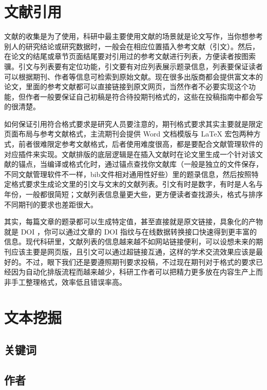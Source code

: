 \documentclass[]{tufte-book}
\begin{document}
\hypertarget{ux6587ux732eux5f15ux7528}{%
\section{文献引用}\label{ux6587ux732eux5f15ux7528}}

文献的收集是为了使用，科研中最主要使用文献的场景就是论文写作，当你想参考别人的研究结论或研究数据时，一般会在相应位置插入参考文献（引文）。然后，在论文的结尾或章节页面结尾要对引用过的参考文献进行列表，方便读者按图索骥。引文与列表要有定位功能，引文要有对应列表展示题录信息，列表要保证读者可以根据期刊、作者等信息可检索到原始文献。现在很多出版商都会提供富文本的论文，里面的参考文献都可以直接链接到原文网页，当然作者不必要实现这个功能，但作者一般要保证自己初稿是符合待投期刊格式的，这些在投稿指南中都会写的很清楚。

如何保证引用符合格式要求是研究人员要注意的，期刊格式要求其实主要就是限定页面布局与参考文献格式，主流期刊会提供 Word 文档模版与 LaTeX 宏包两种方式，前者很难限定参考文献格式，后者使用难度很高，都是要配合文献管理软件的对应插件来实现。文献排版的底层逻辑是在插入文献时在论文里生成一个针对该文献的锚点，当编译或格式化时，通过锚点查找你文献库（一般是独立的文件保存，不同文献管理软件不一样，bib文件相对通用性好些）里的题录信息，然后按照特定格式要求生成论文里的引文与文末的文献列表。引文有时是数字，有时是人名与年份，一般都很简短；文献列表信息量更大些，更方便读者查找源头，格式与排序不同期刊的要求也差距很大。

其实，每篇文章的题录都可以生成特定值，甚至直接就是原文链接，具象化的产物就是 DOI ，你可以通过文章的 DOI 指纹与在线数据转换接口快速得到更丰富的信息。现代科研里，文献列表的信息越来越不如网站链接便利，可以设想未来的期刊应该主要是网页版，且引文可以通过超链接互通，这样的学术交流效果应该是最好的。不过，眼下我们还是要遵照期刊要求投稿，不过现在期刊对于格式的要求已经因为自动化排版流程而越来越少，科研工作者可以把精力更多放在内容生产上而非手工整理格式，效率低且错误率高。

\hypertarget{ux6587ux672cux6316ux6398}{%
\section{文本挖掘}\label{ux6587ux672cux6316ux6398}}

\hypertarget{ux5173ux952eux8bcd}{%
\subsection{关键词}\label{ux5173ux952eux8bcd}}

\hypertarget{ux4f5cux8005}{%
\subsection{作者}\label{ux4f5cux8005}}
\end{document}
